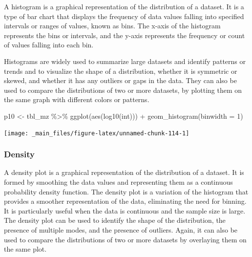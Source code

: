 \documentclass[
]{book}
\newenvironment{Shaded}{\begin{snugshade}}{\end{snugshade}}
\newcommand{\AttributeTok}[1]{\textcolor[rgb]{0.77,0.63,0.00}{#1}}
\newcommand{\DecValTok}[1]{\textcolor[rgb]{0.00,0.00,0.81}{#1}}
\newcommand{\FunctionTok}[1]{\textcolor[rgb]{0.00,0.00,0.00}{#1}}
\newcommand{\NormalTok}[1]{#1}
\newcommand{\OtherTok}[1]{\textcolor[rgb]{0.56,0.35,0.01}{#1}}
\newcommand{\SpecialCharTok}[1]{\textcolor[rgb]{0.00,0.00,0.00}{#1}}
\begin{document}
A histogram is a graphical representation of the distribution of a dataset. It is a type of bar chart that displays the frequency of data values falling into specified intervals or ranges of values, known as bins. The x-axis of the histogram represents the bins or intervals, and the y-axis represents the frequency or count of values falling into each bin.

Histograms are widely used to summarize large datasets and identify patterns or trends and to visualize the shape of a distribution, whether it is symmetric or skewed, and whether it has any outliers or gaps in the data. They can also be used to compare the distributions of two or more datasets, by plotting them on the same graph with different colors or patterns.

\begin{Shaded}
\begin{Highlighting}[]
\NormalTok{p10 }\OtherTok{\textless{}{-}}\NormalTok{ tbl\_mz }\SpecialCharTok{\%\textgreater{}\%} 
  \FunctionTok{ggplot}\NormalTok{(}\FunctionTok{aes}\NormalTok{(}\FunctionTok{log10}\NormalTok{(int))) }\SpecialCharTok{+} 
  \FunctionTok{geom\_histogram}\NormalTok{(}\AttributeTok{binwidth =} \DecValTok{1}\NormalTok{)}
\end{Highlighting}
\end{Shaded}

\begin{center}\texttt{[image: \_main\_files/figure-latex/unnamed-chunk-114-1]} \end{center}

\hypertarget{density}{%
\subsubsection*{Density}\label{density}}

A density plot is a graphical representation of the distribution of a dataset. It is formed by smoothing the data values and representing them as a continuous probability density function. The density plot is a variation of the histogram that provides a smoother representation of the data, eliminating the need for binning. It is particularly useful when the data is continuous and the sample size is large. The density plot can be used to identify the shape of the distribution, the presence of multiple modes, and the presence of outliers. Again, it can also be used to compare the distributions of two or more datasets by overlaying them on the same plot.
\end{document}
